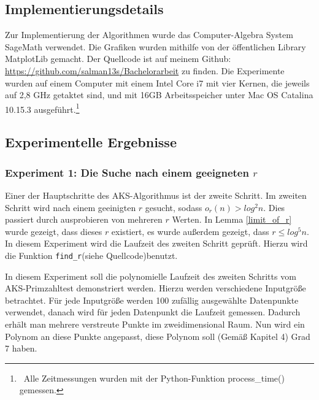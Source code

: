 \documentclass[12pt,oneside]{article}
\theoremstyle{remark}
\theoremstyle{definition}
\begin{document}
\subsection{Implementierungsdetails}
Zur Implementierung der Algorithmen wurde das Computer-Algebra System SageMath verwendet. Die Grafiken wurden mithilfe von der öffentlichen Library MatplotLib gemacht. Der Quellcode ist auf meinem Github: \url{https://github.com/salman13s/Bachelorarbeit} zu finden. Die Experimente wurden auf einem Computer mit einem Intel Core i7 mit vier Kernen, die jeweils auf 2,8 GHz getaktet sind, und mit 16GB Arbeitsspeicher unter Mac OS Catalina 10.15.3 ausgeführt.\footnote{$\,$ Alle Zeitmessungen wurden mit der Python-Funktion process\_time() gemessen.}

\subsection{Experimentelle Ergebnisse}

\subsubsection{Experiment 1: Die Suche nach einem geeigneten $r$}
Einer der Hauptschritte des AKS-Algorithmus ist der zweite Schritt. Im zweiten Schritt wird nach einem geeinigten $r$ gesucht, sodass $o_r(n) > log^2 n$. Dies passiert durch ausprobieren von mehreren $r$ Werten. In Lemma \ref{limit_of_r} wurde gezeigt, dass dieses $r$ existiert, es wurde außerdem gezeigt, dass $r \leq log^5 n$. In diesem Experiment wird die Laufzeit des zweiten Schritt geprüft. Hierzu wird die Funktion \texttt{find\_r}(siehe Quellcode)benutzt.

\textbf{}\newline
In diesem Experiment soll die polynomielle Laufzeit des zweiten Schritts vom AKS-Primzahltest demonstriert werden. Hierzu werden verschiedene Inputgröße betrachtet. Für jede Inputgröße werden 100 zufällig ausgewählte Datenpunkte verwendet, danach wird für jeden Datenpunkt die Laufzeit gemessen. Dadurch erhält man mehrere verstreute Punkte im zweidimensional Raum. Nun wird ein Polynom an diese Punkte angepasst, diese Polynom soll (Gemäß Kapitel 4) Grad 7 haben.   
\end{document}
